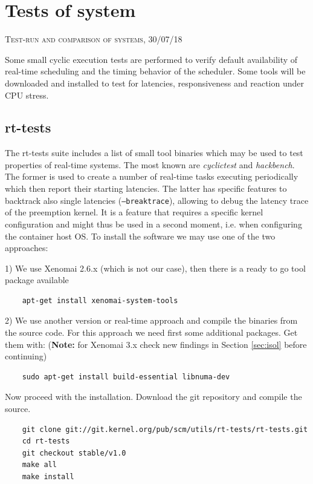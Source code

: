 \documentclass[]{scrartcl}
\begin{document}
\section{Tests of system}

{\small\textsc{Test-run and comparison of systems, 30/07/18} \bigskip}

Some small cyclic execution tests are performed to verify default availability of real-time scheduling and the timing behavior of the scheduler. Some tools will be downloaded and installed to test for latencies, responsiveness and reaction under CPU stress. 

\subsection{rt-tests}

The rt-tests suite includes a list of small tool binaries which may be used to test properties of real-time systems. The most known are \textit{cyclictest} and \textit{hackbench}.
The former is used to create a number of real-time tasks executing periodically which then report their starting latencies. 
The latter has specific features to backtrack also single latencies (\texttt{--breaktrace}), allowing to debug the latency trace of the preemption kernel. 
It is a feature that requires a specific kernel configuration and might thus be used in a second moment, i.e. when configuring the container host OS. 
To install the software we may use one of the two approaches:

1) We use Xenomai 2.6.x (which is not our case), then there is a ready to go tool package available

\begin{verbatim}
	apt-get install xenomai-system-tools
\end{verbatim}

2) We use another version or real-time approach and compile the binaries from the source code.
For this approach we need first some additional packages. Get them with: (\textbf{Note:} for Xenomai 3.x check new findings in Section \ref{sec:isol} before continuing)

\begin{verbatim}
	sudo apt-get install build-essential libnuma-dev
\end{verbatim}

Now proceed with the installation. Download the git repository and compile the source.

\begin{verbatim}
	git clone git://git.kernel.org/pub/scm/utils/rt-tests/rt-tests.git
	cd rt-tests
	git checkout stable/v1.0
	make all
	make install
\end{verbatim}
\end{document}
